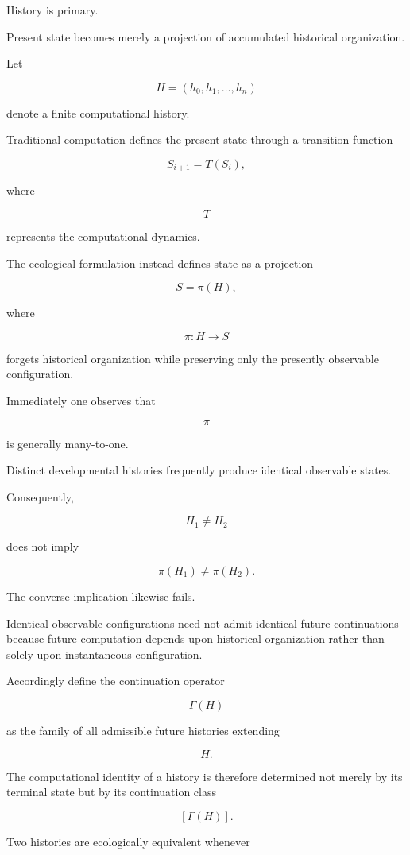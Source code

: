 \documentclass[12pt,oneside]{article}
\theoremstyle{remark}
\begin{document}
History is primary.

Present state becomes merely a projection of accumulated historical
organization.

Let

\[
H
=
(h_0,h_1,\ldots,h_n)
\]

denote a finite computational history.

Traditional computation defines the present state through a transition function

\[
S_{i+1}
=
T(S_i),
\]

where

\[
T
\]

represents the computational dynamics.

The ecological formulation instead defines state as a projection

\[
S
=
\pi(H),
\]

where

\[
\pi
:
H
\rightarrow
S
\]

forgets historical organization while preserving only the presently observable
configuration.

Immediately one observes that

\[
\pi
\]

is generally many-to-one.

Distinct developmental histories frequently produce identical observable
states.

Consequently,

\[
H_1
\neq
H_2
\]

does not imply

\[
\pi(H_1)
\neq
\pi(H_2).
\]

The converse implication likewise fails.

Identical observable configurations need not admit identical future
continuations because future computation depends upon historical organization
rather than solely upon instantaneous configuration.

Accordingly define the continuation operator

\[
\Gamma(H)
\]

as the family of all admissible future histories extending

\[
H.
\]

The computational identity of a history is therefore determined not merely by
its terminal state but by its continuation class

\[
[\Gamma(H)].
\]

Two histories are ecologically equivalent whenever
\end{document}
